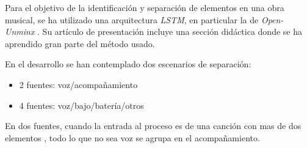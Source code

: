 Para el objetivo de la identificación y separación de elementos en una obra musical, se ha utilizado una arquitectura \textit{LSTM}, en particular la de \textit{Open-Unminx} \cite{rafii18}. Su artículo de presentación incluye una sección didáctica donde se ha aprendido gran parte del método usado. 

En el desarrollo se han contemplado dos escenarios de separación:

\begin{itemize}
    \item 2 fuentes: voz/acompañamiento
    \item 4 fuentes: voz/bajo/batería/otros
\end{itemize}

En dos fuentes, cuando la entrada al proceso es de una canción con mas de dos elementos , todo lo que no sea voz se agrupa en el acompañamiento.
